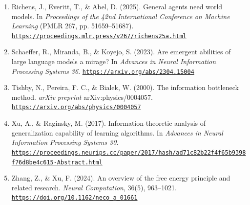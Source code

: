 \documentclass[11pt]{article}
\begin{document}
\begin{enumerate}
\item \label{ref:richens2025}
Richens, J., Everitt, T., \& Abel, D. (2025). General agents need world models. In \textit{Proceedings of the 42nd International Conference on Machine Learning} (PMLR 267, pp. 51659--51687).
\href{https://proceedings.mlr.press/v267/richens25a.html}{\nolinkurl{https://proceedings.mlr.press/v267/richens25a.html}}

\item \label{ref:schaeffer2023}
Schaeffer, R., Miranda, B., \& Koyejo, S. (2023). Are emergent abilities of large language models a mirage? In \textit{Advances in Neural Information Processing Systems 36}.
\href{https://arxiv.org/abs/2304.15004}{\nolinkurl{https://arxiv.org/abs/2304.15004}}

\item \label{ref:tishby2000}
Tishby, N., Pereira, F. C., \& Bialek, W. (2000). The information bottleneck method. \textit{arXiv preprint} arXiv:physics/0004057.
\href{https://arxiv.org/abs/physics/0004057}{\nolinkurl{https://arxiv.org/abs/physics/0004057}}

\item \label{ref:xu2017}
Xu, A., \& Raginsky, M. (2017). Information-theoretic analysis of generalization capability of learning algorithms. In \textit{Advances in Neural Information Processing Systems 30}.
\href{https://proceedings.neurips.cc/paper/2017/hash/ad71c82b22f4f65b9398f76d8be4c615-Abstract.html}{\nolinkurl{https://proceedings.neurips.cc/paper/2017/hash/ad71c82b22f4f65b9398f76d8be4c615-Abstract.html}}

\item \label{ref:zhang2024}
Zhang, Z., \& Xu, F. (2024). An overview of the free energy principle and related research. \textit{Neural Computation}, 36(5), 963--1021.
\href{https://doi.org/10.1162/neco_a_01661}{\nolinkurl{https://doi.org/10.1162/neco_a_01661}}
\end{enumerate}
\end{document}
